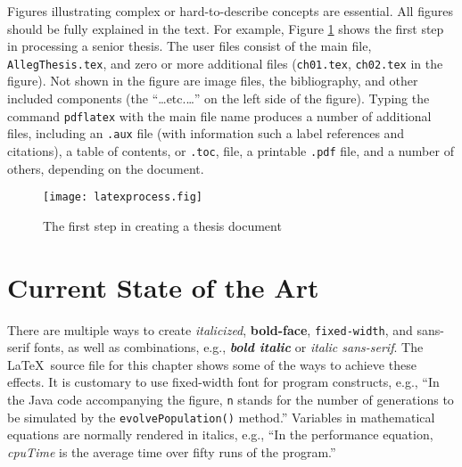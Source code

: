 Figures illustrating complex or hard-to-describe concepts are essential.
All figures should be fully explained in the text. For example,
Figure \ref{latexprocess} shows the first step in processing a senior thesis.
The user files consist of the main file, {\tt AllegThesis.tex}, and zero or
more additional files ({\tt ch01.tex}, {\tt ch02.tex} in the figure). Not shown
in the figure are image files, the bibliography, and other included
components (the ``\ldots etc.\ldots'' on the left side of the figure). 
Typing the command {\tt pdflatex} with the main file name
produces a number of additional files, including an {\tt .aux} file (with
information such a label references and citations),
a table of contents, or {\tt .toc}, file, a printable {\tt .pdf} file, and
a number of others, depending on the document.


\begin{figure}[htbp]
\centering
\texttt{[image: latexprocess.fig]}
\caption{The first step in creating a thesis document}
\label{latexprocess}
\end{figure}

\section{Current State of the Art}\label{sec:stateofart}
There are multiple
ways to create {\it italicized}, {\bf bold-face}, {\tt fixed-width}, and
{\sf sans-serif} fonts, as well as combinations, e.g., \textit{\textbf{
bold italic}} or \textit{\textsf{italic sans-serif}}. The \LaTeX\ source
file for this chapter shows some of the ways to achieve these effects.
It is customary to use fixed-width font for program constructs, e.g.,
``In the Java code accompanying the figure, {\tt n} stands for the 
number of generations to be simulated by the {\tt evolvePopulation()} method.'' 
Variables in mathematical equations are normally rendered in 
italics, e.g., ``In the performance equation, {\it cpuTime} is 
the average time over fifty runs of the program.''

